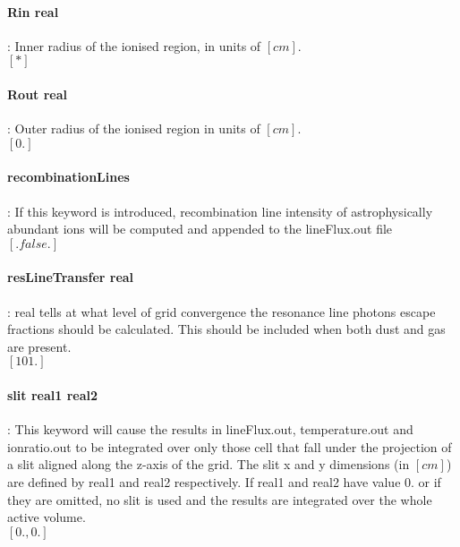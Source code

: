 \documentclass[11pt]{article}
\begin{document}
\paragraph  {  Rin real}	    : Inner radius of the ionised region, in units of $[cm]$.\\
		     $[*]$\\

\paragraph  {  Rout real }      : Outer radius of the ionised region in units of $[cm]$. \\
		     $[0.]$\\

\paragraph   { recombinationLines} : If this keyword is introduced, recombination line intensity of 
                     astrophysically abundant ions will be computed and appended to the 
                     lineFlux.out file \\
		     $[.false.]$\\

\paragraph   { resLineTransfer real} : real tells at what level of grid convergence the resonance 
                     line photons escape fractions should be calculated. This should be 
                     included when both dust and gas are present. \\
		     $[101.]$\\
    
\paragraph   { slit real1 real2} : This keyword will cause the results in lineFlux.out, temperature.out
                     and ionratio.out to be integrated over only those cell that fall under the 
                     projection of a slit aligned along the z-axis of the grid. The slit 
                     x and y dimensions (in $[cm]$) are defined by real1 and real2 respectively. 
		     If real1 and real2 have value 0. or if they are omitted, no slit is used 
		     and the results are integrated over the whole active volume.\\
                     $[0., 0.]$\\
\end{document}
